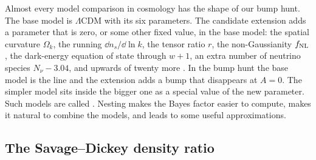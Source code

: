 Almost every model comparison in cosmology has the shape of our bump hunt. The base
model is $\Lambda$CDM with its six parameters. The candidate extension adds a
parameter that is zero, or some other fixed value, in the base model: the spatial
curvature $\Omega_k$, the running $\dd n_s/\dd\ln k$, the tensor ratio $r$, the
non-Gaussianity $f_{\rm NL}$, the dark-energy equation of state through $w+1$, an
extra number of neutrino species $N_\nu-3.04$, and upwards of twenty more
. In the bump hunt the base model is the line and the
extension adds a bump that disappears at $A=0$. The simpler model sits inside the
bigger one as a special value of the new parameter. Such models are called
. Nesting makes the Bayes factor easier to compute, makes it natural to
combine the models, and leads to some useful approximations.

\subsection{The Savage--Dickey density ratio}
\label{5c:sec:sddr}

